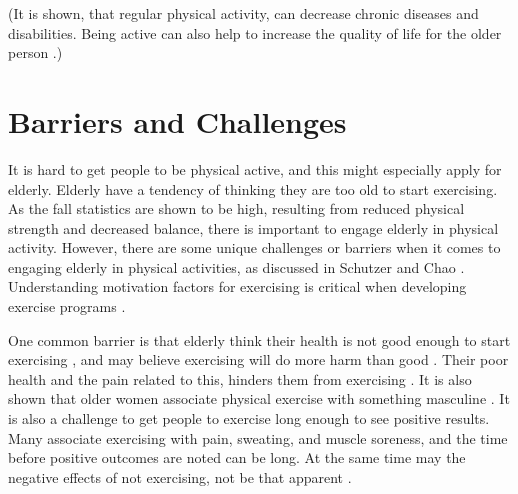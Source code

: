 (It is shown, that regular physical activity, can decrease chronic diseases and disabilities. Being active can also help to increase the quality of life for the older person \cite{schutzer}.)
 
\section{Barriers and Challenges}
It is hard to get people to be physical active, and this might especially apply for elderly. Elderly have a tendency of thinking they are too old to start exercising. As the fall statistics are shown to be high, resulting from reduced physical strength and decreased balance, there is important to engage elderly in physical activity. However, there are some unique challenges or barriers when it comes to engaging elderly in physical activities, as discussed in Schutzer \cite{schutzer} and Chao \cite{chao}.  Understanding motivation factors for exercising is critical when developing exercise programs \cite{chao}.

One common barrier is that elderly think their health is not good enough to start exercising \cite{schutzer}, and may believe exercising will do more harm than good \cite{chao}. Their poor health and the pain related to this, hinders them from exercising \cite{schutzer}. It is also shown that older women associate physical exercise with something masculine \cite{chao}. It is also a challenge to get people to exercise long enough to see positive results. Many associate exercising with pain, sweating, and muscle soreness, and the time before positive outcomes are noted can be long. At the same time may the negative effects of not exercising, not be that apparent \cite{chao}. 

